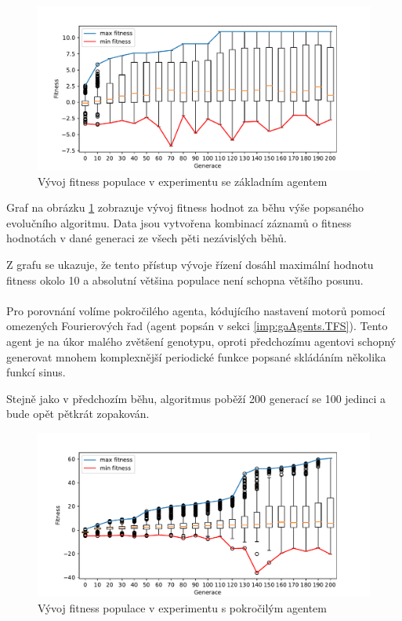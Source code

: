 \begin{figure}[!h]
    \centering
    \includegraphics[width=1\textwidth]{../img/experiment1_Sine_10ticks.pdf}
    \caption{Vývoj fitness populace v experimentu se základním agentem}
    \label{exp:first_sinefull}
\end{figure}

Graf na obrázku \ref{exp:first_sinefull} zobrazuje vývoj fitness
hodnot za běhu výše popsaného evolučního algoritmu. Data jsou vytvořena
kombinací záznamů o fitness hodnotách v dané generaci ze všech pěti nezávislých
běhů.

Z grafu se ukazuje, že tento přístup vývoje řízení dosáhl maximální hodnotu
fitness okolo 10 a absolutní většina populace není schopna většího posunu. 

\paragraph{}
Pro porovnání volíme pokročilého agenta, kódujícího nastavení motorů pomocí
omezených Fourierových řad (agent popsán v sekci \ref{imp:gaAgents.TFS}). Tento agent
je na úkor malého zvětšení genotypu, oproti předchozímu agentovi schopný
generovat mnohem komplexnější periodické funkce popsané skládáním několika
funkcí sinus.

Stejně jako v předchozím běhu, algoritmus poběží 200 generací se 100 jedinci a
bude opět pětkrát zopakován.

\begin{figure}[!h]
    \centering
    \includegraphics[width=1\textwidth]{../img/experiment1_TFS_10ticks.pdf}
    \caption{Vývoj fitness populace v experimentu s pokročilým agentem}
    \label{exp:first_TFS}
\end{figure}

